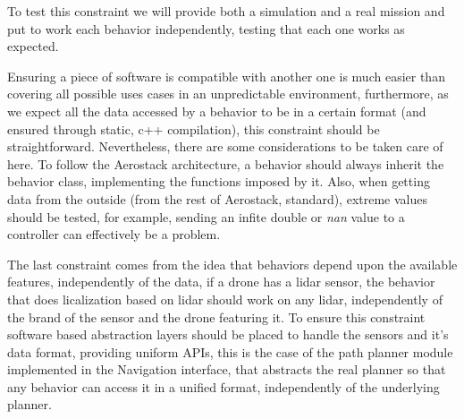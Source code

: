   To test this constraint we will provide both a simulation and a real mission and put to work each behavior independently, testing that each one works as expected.


  Ensuring a piece of software is compatible with another one is much easier than covering all possible uses cases in an unpredictable environment, furthermore, as we expect all the data accessed by a behavior to be in a certain format (and ensured through static, c++ compilation), this constraint should be straightforward. Nevertheless, there are some considerations to be taken care of here. To follow the Aerostack architecture, a behavior should always inherit the behavior class, implementing the functions imposed by it. Also, when getting data from the outside (from the rest of Aerostack, standard), extreme values should be tested, for example, sending an infite double or \textit{nan} value to a controller can effectively be a problem.

  The last constraint comes from the idea that behaviors depend upon the available features, independently of the data, if a drone has a lidar sensor, the behavior that does licalization based on lidar should work on any lidar, independently of the brand of the sensor and the drone featuring it. To ensure this constraint software based abstraction layers should be placed to handle the sensors and it's data format, providing uniform APIs, this is the case of the path planner module implemented in the Navigation interface, that abstracts the real planner so that any behavior can access it in a unified format, independently of the underlying planner.

\pagebreak


